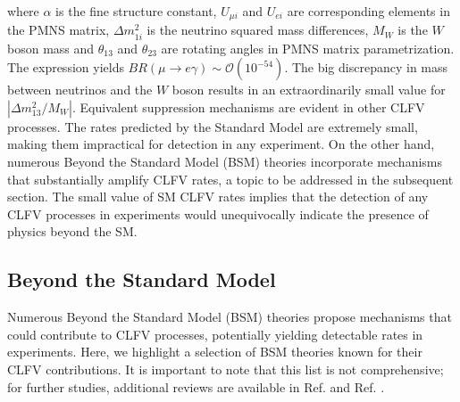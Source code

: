 where $\alpha$ is the fine structure constant, $U_{\mu i}$ and $U_{ei}$ are corresponding elements in the PMNS matrix, $\Delta m_{1i}^2$ is the neutrino squared mass differences, $M_W$ is the $W$ boson mass and $\theta_{13}$ and $\theta_{23}$ are rotating angles in PMNS matrix parametrization. The expression yields $B R(\mu \rightarrow e \gamma) \sim \mathcal{O}(10^{-54})$. The big discrepancy in mass between neutrinos and the $W$ boson results in an extraordinarily small value for $|\Delta m_{13}^2/M_W|$. Equivalent suppression mechanisms are evident in other CLFV processes. The rates predicted by the Standard Model are extremely small, making them impractical for detection in any experiment. On the other hand, numerous Beyond the Standard Model (BSM) theories incorporate mechanisms that substantially amplify CLFV rates, a topic to be addressed in the subsequent section. The small value of SM CLFV rates implies that the detection of any CLFV processes in experiments would unequivocally indicate the presence of physics beyond the SM.
\subsection{Beyond the Standard Model}
Numerous Beyond the Standard Model (BSM) theories propose mechanisms that could contribute to CLFV processes, potentially yielding detectable rates in experiments. Here, we highlight a selection of BSM theories known for their CLFV contributions. It is important to note that this list is not comprehensive; for further studies, additional reviews are available in Ref. \cite{clfv_signorelli} and Ref. \cite{universe8060299}.
